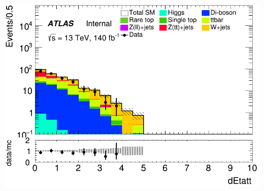 \documentclass[usenames,dvipsnames]{beamer}
\begin{document}
\begin{frame}
    \begin{minipage}{0.32\textwidth}
        \centering
        \includegraphics[width=\textwidth]{graphics/LHH_met/LHH_met_dEtatt.png}
    \end{minipage}
    
    \vspace{0.5cm} %
\end{frame}
\end{document}
